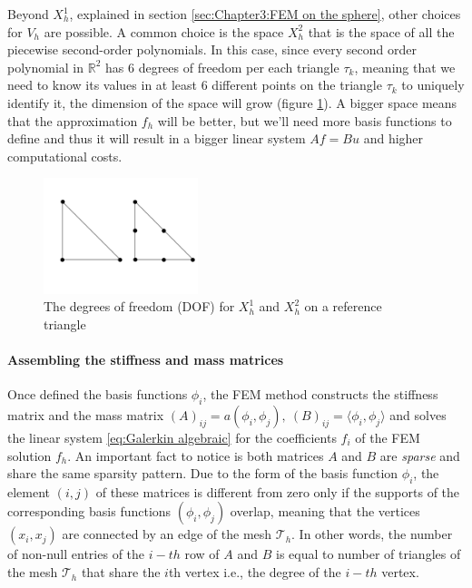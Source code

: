 Beyond $X_h^1$, explained in section \ref{sec:Chapter3:FEM on the sphere}, other choices for $V_h$ are possible. A common choice is the space $X_h^{2}$ that is the space of all the piecewise second-order polynomials. In this case, since every second order polynomial in $\mathbb R^2$ has 6 degrees of freedom per each triangle $\tau_k$, meaning that we need to know its values in at least 6 different points on the triangle $\tau_k$ to uniquely identify it, the dimension of the space will grow (figure \ref{fig:elements}). A bigger space means that the approximation $f_h$ will be better, but we'll need more basis functions to define and thus it will result in a bigger linear system $Af = Bu$ and higher computational costs.
\begin{figure}[h!]
	\begin{center}
		\includegraphics[width=0.4\textwidth]{figs/Chapter3/elemntsP1P2.png}
	\end{center}
	\caption{\label{fig:elements}The degrees of freedom (DOF) for $X_h^{1}$ and $X_h^{2}$ on a reference triangle}
\end{figure}
\paragraph{Assembling the stiffness and mass matrices}
Once defined the basis functions $\phi_i$, the FEM method constructs the stiffness matrix and the mass matrix $(A)_{ij} = a(\phi_i, \phi_j),\  (B)_{ij}=\langle\phi_i,\phi_j\rangle$ and solves the linear system \ref{eq:Galerkin algebraic} for the coefficients $f_i$ of the FEM solution $f_h$. An important fact to notice is both matrices $A$ and $B$ are \textit{sparse} and share the same sparsity pattern. Due to the form of the basis function $\phi_i$, the element $(i, j)$ of these matrices is different from zero only if the supports of the corresponding basis functions $(\phi_i, \phi_j)$ overlap, meaning that the vertices $(x_i, x_j)$ are connected by an edge of the mesh $\mathcal T_h$. In other words, the number of non-null entries of the $i-th$ row of $A$ and $B$ is equal to number of triangles of the mesh $\mathcal T_h$ that share the $i$th vertex i.e., the degree of the $i-th$ vertex.

